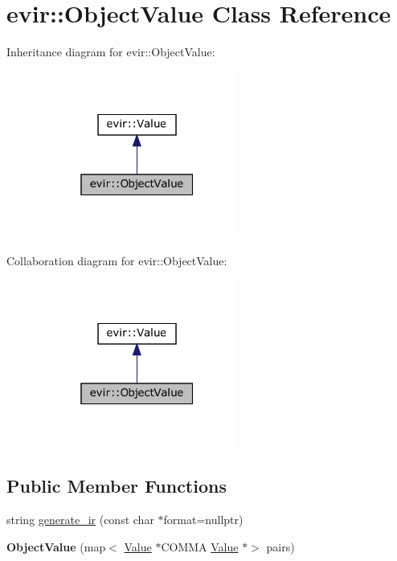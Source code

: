 \hypertarget{classevir_1_1ObjectValue}{}\section{evir\+:\+:Object\+Value Class Reference}
\label{classevir_1_1ObjectValue}


Inheritance diagram for evir\+:\+:Object\+Value\+:\nopagebreak
\begin{figure}[H]
\begin{center}
\leavevmode
\includegraphics[width=184pt]{classevir_1_1ObjectValue__inherit__graph}
\end{center}
\end{figure}


Collaboration diagram for evir\+:\+:Object\+Value\+:\nopagebreak
\begin{figure}[H]
\begin{center}
\leavevmode
\includegraphics[width=184pt]{classevir_1_1ObjectValue__coll__graph}
\end{center}
\end{figure}
\subsection*{Public Member Functions}
\begin{DoxyCompactItemize}
\item 
string \hyperlink{classevir_1_1ObjectValue_a1058f47731ab800327893e388fc2b2d0}{generate\+\_\+ir} (const char $\ast$format=nullptr)
\item 
\mbox{\label{classevir_1_1ObjectValue_aa73660ddf07e9428f8758c370b66c604}} 
{\bfseries Object\+Value} (map$<$ \hyperlink{classevir_1_1Value}{Value} $\ast$C\+O\+M\+MA \hyperlink{classevir_1_1Value}{Value} $\ast$$>$ pairs)
\end{DoxyCompactItemize}
